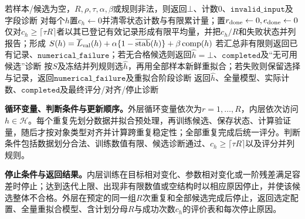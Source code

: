 \begin{AlgorithmContract}
\begin{algorithm}[H]
若样本/候选为空，$R,\rho,\tau,\alpha,\beta$或规则非法，则返回$\bot$、计数$0$、$\mathtt{invalid\_input}$及字段诊断\;
对每个$h$置$c_h\leftarrow0$并清零状态计数与有限累计量；置$r_{\rm done}\leftarrow0,e_{\rm done}\leftarrow0$\;
仅对$c_h\ge\lceil\tau R\rceil$者以其已登记有效记录形成有限平均量，并把$c_h/R$和失败状态并列报告；形成
$S(h)=\overline L_{\rm val}(h)+\alpha\{1-\overline{\rm stab}(h)\}+\beta\,{\rm comp}(h)$\;
若汇总非有限则返回已有记录、$\mathtt{numerical\_failure}$；若无合格候选则返回$\widehat h=\bot$、$\mathtt{completed}$及“无可用候选”诊断\;
按$S$及冻结并列规则选$\widehat h$，再用全部样本新鲜重拟合；若失败则保留选择与记录，返回$\mathtt{numerical\_failure}$及重拟合阶段诊断\;
返回$\widehat h$、全量模型、实际计数、$\mathtt{completed}$及最终评分/对齐/停止诊断\;
\end{algorithm}
\end{AlgorithmContract}

\label{struct:V4-C01-CH23}
\textbf{循环变量、判断条件与更新顺序。}外层循环变量依次为$r=1,\ldots,R$，内层依次访问$h\in\mathcal H$。每个重复先划分数据并拟合预处理，再训练候选、保存状态、计算验证量，随后才按对象类型对齐并计算跨重复稳定性；全部重复完成后统一评分。判断条件包括数据划分合法、训练数值有限、候选诊断通过、$c_h\ge\lceil\tau R\rceil$以及评分并列规则。

\label{struct:V4-C01-CH24}
\textbf{停止条件与返回结果。}内层训练在目标相对变化、参数相对变化或一阶残差满足容差时停止；达到迭代上限、出现非有限数值或空结构时以相应原因停止，并使该候选整体不合格。外层在预定的同一组$R$次重复和全部候选完成后停止，返回选定配置、全量重拟合模型、含计划分母$R$与成功次数$c_h$的评价表和每次停止原因。


